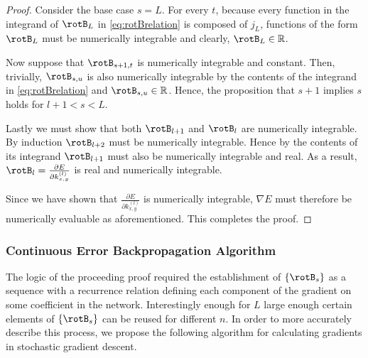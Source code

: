 \begin{proof}
  Consider the base case $s = L$. For every $t$,
  because every function in the integrand of $\rotB_L$ in \eqref{eq:rotBrelation} is composed of $j_L$, functions of the form $\rotB_L$ must be numerically integrable and clearly, $\rotB_L \in \mathbb{R}$.

  Now suppose that $\rotB_{s+1,t}$ is numerically integrable and constant. Then, trivially, $\rotB_{s,u}$ is also numerically integrable by the contents of the integrand in \eqref{eq:rotBrelation} and $\rotB_{s,u} \in \mathbb{R}$. Hence, the proposition that $s+1$ implies $s$ holds for $l+1 < s < L$.

  Lastly we must show that both $\rotB_{l+1}$ and $\rotB_{l}$ are numerically integrable. By induction $\rotB_{l+2}$ must be numerically integrable. Hence by the contents of its integrand $\rotB_{l+1}$ must also be numerically integrable and real. As a result, $\rotB_l =  \frac{\partial E}{\partial k^{(l)}_{x,y}}$ is real and numerically integrable.

  Since we have shown that $ \frac{\partial E}{\partial k^{(l)}_{x,y}}$ is numerically integrable, $\nabla E$ must therefore be numerically evaluable as aforementioned. This completes the proof.
\end{proof}


\subsubsection{Continuous Error Backpropagation Algorithm}
The logic of the proceeding proof required the establishment of $\{\rotB_s\}$ as a sequence with a recurrence relation defining each component of the gradient on some coefficient in the network. Interestingly enough for $L$ large enough certain elements of $\{\rotB_s\}$ can be reused for different $n$. In order to more accurately describe this process, we propose the following algorithm for calculating gradients in stochastic gradient descent. \\

